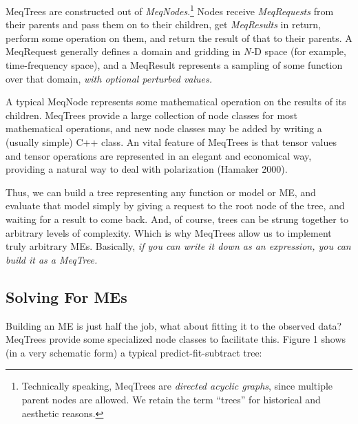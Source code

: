 \documentclass[11pt,twoside]{article}  %
\begin{document}
MeqTrees are constructed out of {\em MeqNodes}.\footnote{Technically speaking,
MeqTrees are {\em directed acyclic graphs}, since multiple parent nodes are
allowed. We retain the term ``trees'' for historical and aesthetic reasons.}
Nodes receive {\em MeqRequests} from their parents and pass them on to their
children, get {\em MeqResults} in return, perform some operation on them, and
return the result of that to their parents. A MeqRequest generally defines a
domain and gridding in {\em N-}D space (for example, time-frequency space), and
a MeqResult represents a sampling of some function over that domain, {\em with
optional perturbed values.}

A typical MeqNode represents some mathematical operation on the results of its
children. MeqTrees provide a large collection of node classes for most
mathematical operations, and new node classes may be added by writing a (usually
simple) C++ class. An vital feature of MeqTrees is that tensor values and tensor
operations are represented in an elegant and economical way, providing a 
natural way to deal with polarization (Hamaker 2000).

Thus, we can build a tree representing any function or model or ME, and
evaluate that model simply by giving a request to the root node of the tree, and
waiting for a result to come back. And, of course, trees can be strung together
to arbitrary levels of complexity. Which is why MeqTrees allow us to implement
truly arbitrary MEs. Basically, {\em if you can write it down as an expression,
you can build it as a MeqTree.}

\subsection{Solving For MEs}

Building an ME is just half the job, what about fitting it to the observed data?
MeqTrees provide some specialized node classes to facilitate this. Figure 1
shows (in a very schematic form) a typical predict-fit-subtract tree:
\end{document}
